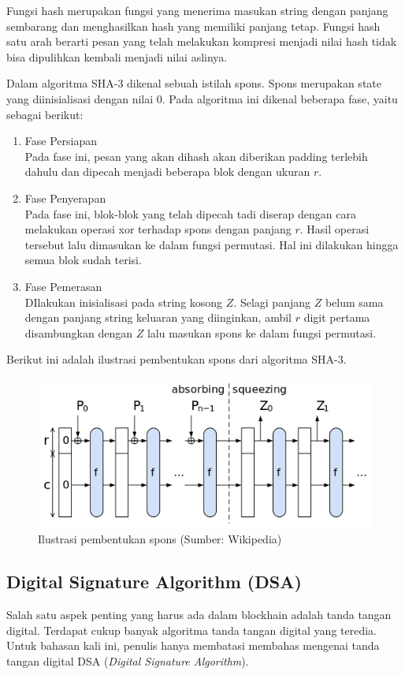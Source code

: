 \documentclass[10pt,conference]{IEEEtran}
\theoremstyle{definition}
\begin{document}
Fungsi hash merupakan fungsi yang menerima masukan string dengan panjang sembarang dan menghasilkan hash yang memiliki panjang tetap. Fungsi hash satu arah berarti pesan yang telah melakukan kompresi menjadi nilai hash tidak bisa dipulihkan kembali menjadi nilai aslinya. \cite{b1}

Dalam algoritma SHA-3 dikenal sebuah istilah spons. Spons merupakan state yang diinisialisasi dengan nilai 0. Pada algoritma ini dikenal beberapa fase, yaitu sebagai berikut: \cite{b1}

\begin{enumerate}
    \item Fase Persiapan \\
    Pada fase ini, pesan yang akan dihash akan diberikan padding terlebih dahulu dan dipecah menjadi beberapa blok dengan ukuran $r$. 
    \item Fase Penyerapan \\
    Pada fase ini, blok-blok yang telah dipecah tadi diserap dengan cara melakukan operasi xor terhadap spons dengan panjang $r$. Hasil operasi tersebut lalu dimasukan ke dalam fungsi permutasi. Hal ini dilakukan hingga semua blok sudah terisi.
    \item Fase Pemerasan \\
    DIlakukan inisialisasi pada string kosong $Z$. Selagi panjang $Z$ belum sama dengan panjang string keluaran yang diinginkan, ambil $r$ digit pertama disambungkan dengan $Z$ lalu masukan spons ke dalam fungsi permutasi.   
\end{enumerate}

Berikut ini adalah ilustrasi pembentukan spons dari algoritma SHA-3.

\begin{figure}[htbp]
    \centerline{\includegraphics[width=0.9\columnwidth]{fig1.png}}
    \caption{Ilustrasi pembentukan spons (Sumber: Wikipedia)}
\end{figure}

\subsection{Digital Signature Algorithm (DSA)}
Salah satu aspek penting yang harus ada dalam blockhain adalah tanda tangan digital. Terdapat cukup banyak algoritma tanda tangan digital yang teredia. Untuk bahasan kali ini, penulis hanya membatasi membahas mengenai tanda tangan digital DSA (\emph{Digital Signature Algorithm}).
\end{document}
